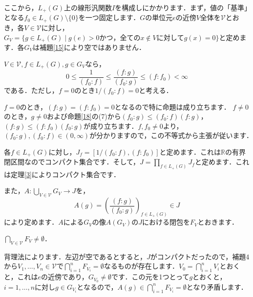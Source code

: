 ここから，$L_{+}(G)$上の線形汎関数$I$を構成しにかかります．まず，値の「基準」となる$f_{0} \in L_{+}(G) \setminus \{ 0 \}$を一つ固定します．$G$の単位元$e$の近傍$V$全体を$\mathscr{V}$とおき，各$V \in \mathscr{V}$に対し，$G_{V}=\{ g \in L_{+}(G) \mid g(e)>0 かつ，全ての x \not\in V に対してg(x)=0 \}$と定めます．各$G_V$は補題\ref{15}により空ではありません．

\begin{yprop}\label{19}
$V \in \mathscr{V}, f \in L_{+}(G), g \in G_{V}$なら，
\[
0 \le \frac{1}{( f_0 : f )} \le \frac{( f : g )}{( f_0 : g )} \le ( f : f_0 ) < \infty
\]
である．ただし，$f=0$のとき$1/( f_0 : f ) = 0$と考える．
\end{yprop}
\begin{Proof}
$f=0$のとき，$( f : g ) = ( f : f_0 ) = 0$となるので特に命題は成り立ちます．
$f \ne 0$のとき，$g \neq 0$および命題\ref{18}の(7)から$(f_0 : g) \le (f_0 : f) (f : g )$，$ (f : g) \le (f : f_0 ) (f_0 : g )$が成り立ちます．$f, f_0 \neq 0$より，$(f_0 : g), (f_0 : f) \in (0, \infty)$が分かりますので，この不等式から主張が従います．　
\end{Proof}

各$f \in L_{+}(G)$に対し，$J_{f}=[1/ ( f_0 : f ) , ( f : f_{0} )]$と定めます．これは$\mathbb{R}$の有界閉区間なのでコンパクト集合です．そして，$J=\prod_{f \in L_{+}(G)} J_f$と定めます．これは定理\ref{3}によりコンパクト集合です．

また，$A : \bigcup_{V \in \mathscr{V}}G_V \to J$を，
\[
A(g)=\left( \frac{( f : g )}{( f_0 : g )} \right)_{f \in L_{+}(G)} \in J
\]
により定めます．$A$による$G_V$の像$A(G_V)$の$J$における閉包を$F_V$とおきます．
\begin{yprop}\label{20}
$\bigcap_{V \in \mathscr{V}}F_V \neq \emptyset$．
\end{yprop}
\begin{Proof}
背理法によります．左辺が空であるとすると，$J$がコンパクトだったので，補題4から$V_1, \ldots , V_n \in \mathscr{V}$で$\bigcap_{i=1}^{n}F_{V_i}=\emptyset$なるものが存在します．$V_0=\bigcap_{i=1}^{n}V_i$とおくと，これは$e$の近傍であり，$G_{V_0} \neq \emptyset$です．この元を1つとって$g$とおくと，$i=1, \ldots , n$に対し$g \in G_{V_i}$となるので，$A(g) \in \bigcap_{i=1}^{n}F_{V_i}=\emptyset$となり矛盾します．　
\end{Proof}

